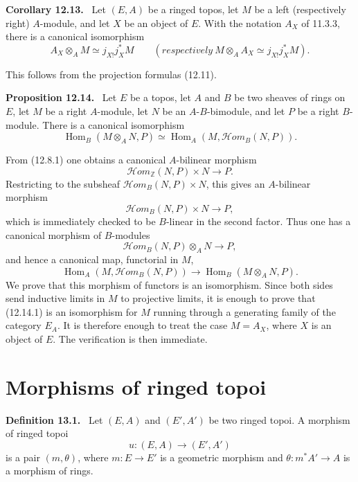 \documentclass[11pt]{article}
\newcommand{\ZZ}{\mathbb{Z}}
\newcommand{\Hom}{\operatorname{Hom}}
\newcommand{\scrHom}{\mathscr{H}\!om}
\newcommand{\resp}{respectively}
\newenvironment{statement}[1]{\par\medskip\noindent\textbf{#1.}\ }{\par\medskip}
\begin{document}
\begin{statement}{Corollary 12.13}
Let $(E,A)$ be a ringed topos, let $M$ be a left (respectively right) $A$-module, and let $X$ be an object of $E$. With the notation $A_X$ of 11.3.3, there is a canonical isomorphism
\[
A_X\otimes_AM\simeq j_{X!}j_X^*M
\qquad
(\resp\ M\otimes_AA_X\simeq j_{X!}j_X^*M).
\]
\end{statement}

This follows from the projection formulas (12.11).

\begin{statement}{Proposition 12.14}
Let $E$ be a topos, let $A$ and $B$ be two sheaves of rings on $E$, let $M$ be a right $A$-module, let $N$ be an $A$-$B$-bimodule, and let $P$ be a right $B$-module. There is a canonical isomorphism
\[
\Hom_B(M\otimes_A N,P)\simeq \Hom_A(M,\scrHom_B(N,P)).
\]
\end{statement}

From (12.8.1) one obtains a canonical $A$-bilinear morphism
\[
\scrHom_{\ZZ}(N,P)\times N\longrightarrow P.
\]
Restricting to the subsheaf $\scrHom_B(N,P)\times N$, this gives an $A$-bilinear morphism
\[
\scrHom_B(N,P)\times N\longrightarrow P,
\]
which is immediately checked to be $B$-linear in the second factor. Thus one has a canonical morphism of $B$-modules
\[
\scrHom_B(N,P)\otimes_A N\longrightarrow P,
\]
and hence a canonical map, functorial in $M$,
\begin{equation}
\Hom_A(M,\scrHom_B(N,P))\longrightarrow \Hom_B(M\otimes_A N,P).\tag{12.14.1}
\end{equation}
We prove that this morphism of functors is an isomorphism. Since both sides send inductive limits in $M$ to projective limits, it is enough to prove that (12.14.1) is an isomorphism for $M$ running through a generating family of the category $E_A$. It is therefore enough to treat the case $M=A_X$, where $X$ is an object of $E$. The verification is then immediate.

\section{Morphisms of ringed topoi}

\begin{statement}{Definition 13.1}
Let $(E,A)$ and $(E',A')$ be two ringed topoi. A morphism of ringed topoi
\[
u:(E,A)\longrightarrow (E',A')
\]
is a pair $(m,\theta)$, where $m:E\to E'$ is a geometric morphism and $\theta:m^*A'\to A$ is a morphism of rings.
\end{statement}
\end{document}
